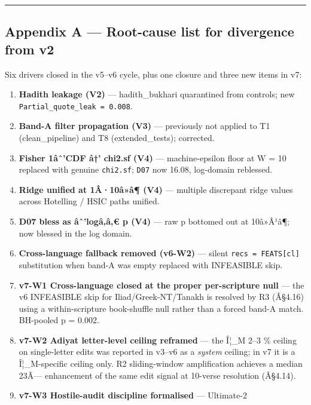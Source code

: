 \documentclass[
]{article}
\providecommand{\tightlist}{%
  \setlength{\itemsep}{0pt}\setlength{\parskip}{0pt}}
\begin{document}
\begin{center}\rule{0.5\linewidth}{0.5pt}\end{center}

\subsection{Appendix A --- Root-cause list for divergence from
v2}\label{appendix-a-root-cause-list-for-divergence-from-v2}

Six drivers closed in the v5--v6 cycle, plus one closure and three new
items in v7:

\begin{enumerate}
\def\labelenumi{\arabic{enumi}.}
\tightlist
\item
  \textbf{Hadith leakage (V2)} --- hadith\_bukhari quarantined from
  controls; new \texttt{Partial\_quote\_leak\ =\ 0.008}.
\item
  \textbf{Band-A filter propagation (V3)} --- previously not applied to
  T1 (clean\_pipeline) and T8 (extended\_tests); corrected.
\item
  \textbf{Fisher 1âˆ'CDF â†' chi2.sf (V4)} --- machine-epsilon floor at
  W = 10 replaced with genuine \texttt{chi2.sf}; \texttt{D07} now 16.08,
  log-domain reblessed.
\item
  \textbf{Ridge unified at 1Â·10â»â¶ (V4)} --- multiple discrepant ridge
  values across Hotelling / HSIC paths unified.
\item
  \textbf{D07 bless as âˆ'logâ‚â‚€ p (V4)} --- raw p bottomed out at
  10â»Â¹â¶; now blessed in the log domain.
\item
  \textbf{Cross-language fallback removed (v6-W2)} --- silent
  \texttt{recs\ =\ FEATS{[}cl{]}} substitution when band-A was empty
  replaced with INFEASIBLE skip.
\item
  \textbf{v7-W1 Cross-language closed at the proper per-scripture null}
  --- the v6 INFEASIBLE skip for Iliad/Greek-NT/Tanakh is resolved by R3
  (Â§4.16) using a within-scripture book-shuffle null rather than a
  forced band-A match. BH-pooled p = 0.002.
\item
  \textbf{v7-W2 Adiyat letter-level ceiling reframed} --- the Î¦\_M 2--3
  \% ceiling on single-letter edits was reported in v3--v6 as a
  \emph{system} ceiling; in v7 it is a Î¦\_M-specific ceiling only. R2
  sliding-window amplification achieves a median 23Ã--- enhancement of
  the same edit signal at 10-verse resolution (Â§4.14).
\item
  \textbf{v7-W3 Hostile-audit discipline formalised} --- Ultimate-2

\end{enumerate}
\end{document}
